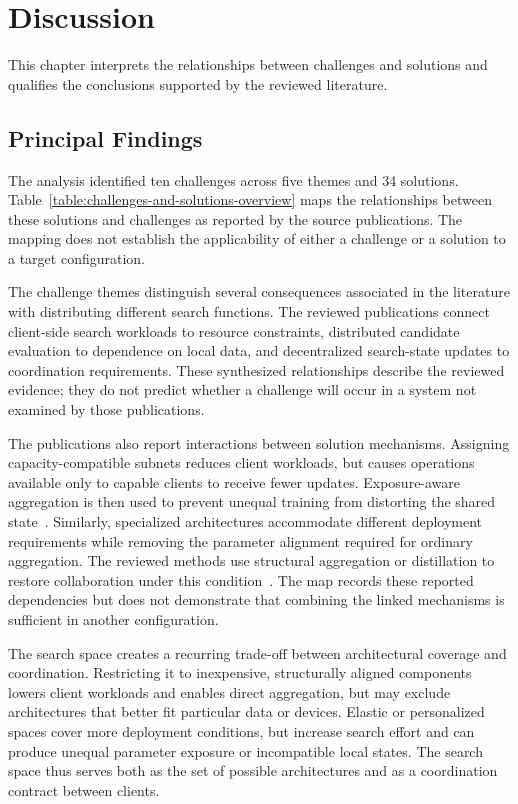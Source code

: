 \chapter{Discussion}\label{chapter:discussion}

This chapter interprets the relationships between challenges and solutions and qualifies the conclusions supported by the reviewed literature.

\section{Principal Findings}

The analysis identified ten challenges across five themes and 34 solutions. Table~\ref{table:challenges-and-solutions-overview} maps the relationships between these solutions and challenges as reported by the source publications. The mapping does not establish the applicability of either a challenge or a solution to a target configuration.

The challenge themes distinguish several consequences associated in the literature with distributing different search functions. The reviewed publications connect client-side search workloads to resource constraints, distributed candidate evaluation to dependence on local data, and decentralized search-state updates to coordination requirements. These synthesized relationships describe the reviewed evidence; they do not predict whether a challenge will occur in a system not examined by those publications.

The publications also report interactions between solution mechanisms. Assigning capacity-compatible subnets reduces client workloads, but causes operations available only to capable clients to receive fewer updates. Exposure-aware aggregation is then used to prevent unequal training from distorting the shared state~\cite{fedoras_2022,fgfl_2024,supernet_trade-off_fednas_2025}. Similarly, specialized architectures accommodate different deployment requirements while removing the parameter alignment required for ordinary aggregation. The reviewed methods use structural aggregation or distillation to restore collaboration under this condition~\cite{multi-granular_fednas_2023,f2nas_2024,hapfnas_2025}. The map records these reported dependencies but does not demonstrate that combining the linked mechanisms is sufficient in another configuration.

The search space creates a recurring trade-off between architectural coverage and coordination. Restricting it to inexpensive, structurally aligned components lowers client workloads and enables direct aggregation, but may exclude architectures that better fit particular data or devices. Elastic or personalized spaces cover more deployment conditions, but increase search effort and can produce unequal parameter exposure or incompatible local states. The search space thus serves both as the set of possible architectures and as a coordination contract between clients.


